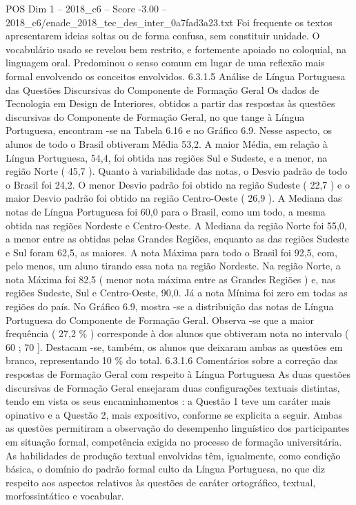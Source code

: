 \begin{textsample}{POS Dim 1 – 2018\_c6 – Score -3.00 – 2018\_c6/enade\_2018\_tec\_des\_inter\_0a7fad3a23.txt}
Foi frequente os textos apresentarem ideias soltas ou de forma confusa, sem constituir unidade.
O vocabulário usado se revelou bem restrito, e fortemente apoiado no coloquial, na linguagem oral.
Predominou o senso comum em lugar de uma reflexão mais formal envolvendo os conceitos envolvidos. 6.3.1.5 Análise de Língua Portuguesa das Questões Discursivas do Componente de Formação Geral Os dados de Tecnologia em Design de Interiores, obtidos a partir das respostas às questões discursivas do Componente de Formação Geral, no que tange à Língua Portuguesa, encontram -se na Tabela 6.16 e no Gráfico 6.9.
Nesse aspecto, os alunos de todo o Brasil obtiveram Média 53,2.
A maior Média, em relação à Língua Portuguesa, 54,4, foi obtida nas regiões Sul e Sudeste, e a menor, na região Norte ( 45,7 ).
Quanto à variabilidade das notas, o Desvio padrão de todo o Brasil foi 24,2.
O menor Desvio padrão foi obtido na região Sudeste ( 22,7 ) e o maior Desvio padrão foi obtido na região Centro-Oeste ( 26,9 ).
A Mediana das notas de Língua Portuguesa foi 60,0 para o Brasil, como um todo, a mesma obtida nas regiões Nordeste e Centro-Oeste.
A Mediana da região Norte foi 55,0, a menor entre as obtidas pelas Grandes Regiões, enquanto as das regiões Sudeste e Sul foram 62,5, as maiores.
A nota Máxima para todo o Brasil foi 92,5, com, pelo menos, um aluno tirando essa nota na região Nordeste.
Na região Norte, a nota Máxima foi 82,5 ( menor nota máxima entre as Grandes Regiões ) e, nas regiões Sudeste, Sul e Centro-Oeste, 90,0.
Já a nota Mínima foi zero em todas as regiões do país.
No Gráfico 6.9, mostra -se a distribuição das notas de Língua Portuguesa do Componente de Formação Geral.
Observa -se que a maior frequência ( 27,2 \% ) corresponde à dos alunos que obtiveram nota no intervalo ( 60 ; 70 ].
Destacam -se, também, os alunos que deixaram ambas as questões em branco, representando 10 \% do total. 6.3.1.6 Comentários sobre a correção das respostas de Formação Geral com respeito à Língua Portuguesa As duas questões discursivas de Formação Geral ensejaram duas configurações textuais distintas, tendo em vista os seus encaminhamentos : a Questão 1 teve um caráter mais opinativo e a Questão 2, mais expositivo, conforme se explicita a seguir.
Ambas as questões permitiram a observação do desempenho linguístico dos participantes em situação formal, competência exigida no processo de formação universitária.
As habilidades de produção textual envolvidas têm, igualmente, como condição básica, o domínio do padrão formal culto da Língua Portuguesa, no que diz respeito aos aspectos relativos às questões de caráter ortográfico, textual, morfossintático e vocabular.

\end{textsample}
